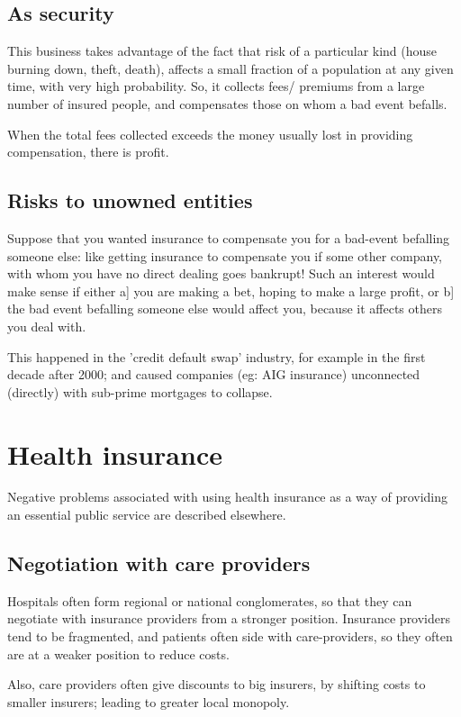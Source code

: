 \documentclass[oneside, article]{memoir}
\begin{document}
\subsection{As security}
This business takes advantage of the fact that risk of a particular kind (house burning down, theft, death), affects a small fraction of a population at any given time, with very high probability. So, it collects fees/ premiums from a large number of insured people, and compensates those on whom a bad event befalls.

When the total fees collected exceeds the money usually lost in providing compensation, there is profit.

\subsection{Risks to unowned entities}
Suppose that you wanted insurance to compensate you for a bad-event befalling someone else: like getting insurance to compensate you if some other company, with whom you have no direct dealing goes bankrupt! Such an interest would make sense if either a] you are making a bet, hoping to make a large profit, or b] the bad event befalling someone else would affect you, because it affects others you deal with.

This happened in the 'credit default swap' industry, for example in the first decade after 2000; and caused companies (eg: AIG insurance) unconnected (directly) with sub-prime mortgages to collapse.

\section{Health insurance}
Negative problems associated with using health insurance as a way of providing an essential public service are described elsewhere.

\subsection{Negotiation with care providers}
Hospitals often form regional or national conglomerates, so that they can negotiate with insurance providers from a stronger position. Insurance providers tend to be fragmented, and patients often side with care-providers, so they often are at a weaker position to reduce costs.

Also, care providers often give discounts to big insurers, by shifting costs to smaller insurers; leading to greater local monopoly.
\end{document}
